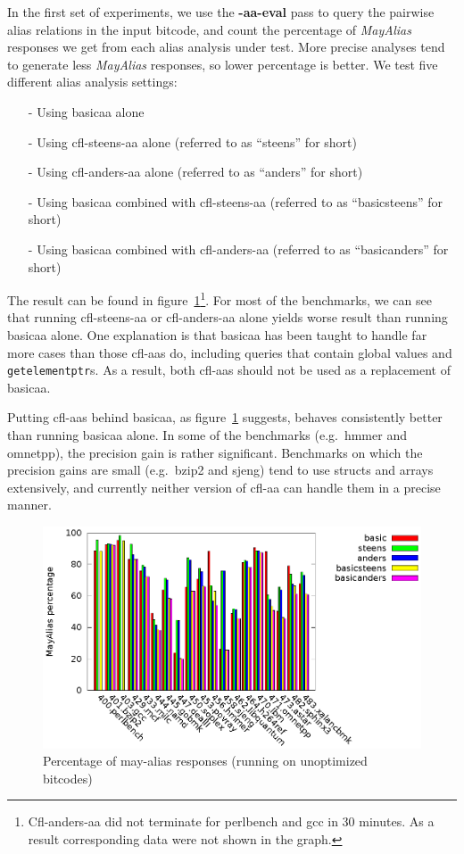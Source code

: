 \documentclass[10pt]{article}
\begin{document}
In the first set of experiments, we use the \textbf{-aa-eval} pass to query the
pairwise alias relations in the input bitcode, and count the percentage of
\emph{MayAlias} responses we get from each alias analysis under test. More
precise analyses tend to generate less \emph{MayAlias} responses, so lower
percentage is better. We test five different alias analysis settings:
\begin{itemize}
\item[-] Using basicaa alone
\item[-] Using cfl-steens-aa alone (referred to as ``steens'' for short)
\item[-] Using cfl-anders-aa alone (referred to as ``anders'' for short)
\item[-] Using basicaa combined with cfl-steens-aa (referred to as
  ``basicsteens'' for short)
\item[-] Using basicaa combined with cfl-anders-aa (referred to as
  ``basicanders'' for short)
\end{itemize}

The result can be found in figure~\ref{fig:alias_O0}\footnote{Cfl-anders-aa did not terminate for
  perlbench and gcc in 30 minutes. As a result corresponding data were not shown in the graph.}. For most of the
benchmarks, we can see that running cfl-steens-aa or cfl-anders-aa alone yields
worse result than running basicaa alone. One explanation is that basicaa has
been taught to handle far more cases than those cfl-aas do, including queries
that contain global values and \texttt{getelementptr}s. As a result, both
cfl-aas should not be used as a replacement of basicaa.

Putting cfl-aas behind basicaa, as figure~\ref{fig:alias_O0} suggests, behaves
consistently better than running basicaa alone. In some of the benchmarks (e.g.\
hmmer and omnetpp), the precision gain is rather significant. Benchmarks on
which the precision gains are small (e.g.\ bzip2 and sjeng) tend to use
structs and arrays extensively, and currently neither version of cfl-aa can handle
them in a precise manner.

\begin{figure}
  \centering
  \includegraphics[width=\linewidth]{result/alias/aliasO0.eps}
  \caption{Percentage of may-alias responses (running on unoptimized bitcodes)\label{fig:alias_O0}}
\end{figure}
\end{document}
